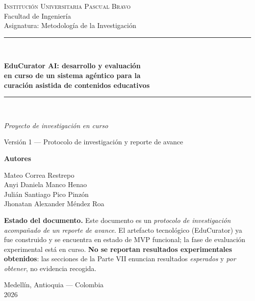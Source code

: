 \begin{titlepage}
\centering
\thispagestyle{empty}

\vspace*{1.5cm}

{\large\scshape Institución Universitaria Pascual Bravo}\\[0.3cm]
{\normalsize Facultad de Ingeniería}\\[0.2cm]
{\normalsize Asignatura: Metodología de la Investigación}\\[2.2cm]

{\color{ecAzul}\rule{\textwidth}{1pt}}\\[0.8cm]

{\LARGE\bfseries EduCurator AI: desarrollo y evaluación\\[0.25cm]
en curso de un sistema agéntico para la\\[0.25cm]
curación asistida de contenidos educativos\par}

\vspace{0.8cm}
{\color{ecAzul}\rule{\textwidth}{1pt}}\\[1.2cm]

{\large\itshape Proyecto de investigación en curso\par}
\vspace{0.3cm}
{\normalsize Versión 1 --- Protocolo de investigación y reporte de avance\par}

\vspace{2.2cm}

{\large\bfseries Autores\par}
\vspace{0.4cm}
{\normalsize
Mateo Correa Restrepo\\[0.15cm]
Anyi Daniela Manco Henao\\[0.15cm]
Julián Santiago Pico Pinzón\\[0.15cm]
Jhonatan Alexander Méndez Roa\par}

\vfill

\begin{estado}[width=0.88\textwidth]
\small
\textbf{Estado del documento.} Este documento es un \emph{protocolo de investigación
acompañado de un reporte de avance}. El artefacto tecnológico (EduCurator) ya fue
construido y se encuentra en estado de MVP funcional; la fase de evaluación
experimental está en curso. \textbf{No se reportan resultados experimentales
obtenidos}: las secciones de la Parte VII enuncian resultados \emph{esperados} y
\emph{por obtener}, no evidencia recogida.
\end{estado}

\vspace{1.2cm}

{\normalsize Medellín, Antioquia --- Colombia\\[0.15cm] 2026\par}

\end{titlepage}
